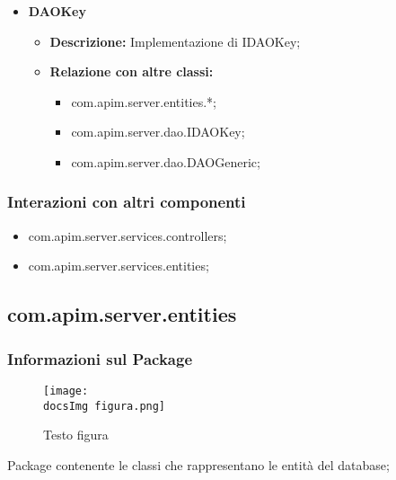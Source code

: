 {{{{{\begin{itemize}
\begin{itemize}
            \begin{itemize}
              \item com.apim.server.dao.DAOFactory;
            \end{itemize}
          \end{itemize}
          \item \textbf{DAOKey}
          \begin{itemize}
            \item \textbf{Descrizione:} Implementazione di IDAOKey;
            \item \textbf{Relazione con altre classi:}
            \begin{itemize}
              \item com.apim.server.entities.*;
              \item com.apim.server.dao.IDAOKey;
              \item com.apim.server.dao.DAOGeneric;
            \end{itemize}
          \end{itemize}
       \end{itemize}
       \subsubsection{Interazioni con altri componenti}
          \begin{itemize}
            \item com.apim.server.services.controllers;
            \item com.apim.server.services.entities;
          \end{itemize}
          
          
          \subsection{com.apim.server.entities}{
    \subsubsection{Informazioni sul Package}
        \begin{figure}[ht]
          \centering
          \texttt{[image: \\docsImg figura.png]}
          \caption{Testo figura}
          \label{Testo figura}
        \end{figure}
       Package contenente le classi che rappresentano le entità del database;
}}}}}}
